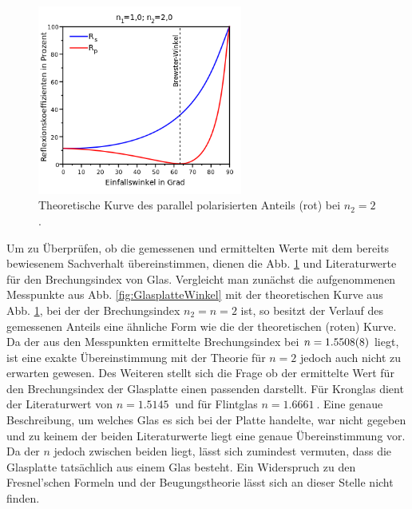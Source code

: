 		\begin{figure}[ht]
			\centering
			\includegraphics[width=0.6\textwidth]{bilder/wikiBrewster.png}
			\caption{Theoretische Kurve des parallel polarisierten Anteils (rot) bei $n_2 = 2$. \cite{wikiBrewster}}
			\label{fig:wiki_brewster}	
		\end{figure}
		Um zu Überprüfen, ob die gemessenen und ermittelten Werte mit dem bereits bewiesenem Sachverhalt übereinstimmen, dienen die Abb. \ref{fig:wiki_brewster} und Literaturwerte für den Brechungsindex von Glas.
		Vergleicht man zunächst die aufgenommenen Messpunkte aus Abb. \ref{fig:GlasplatteWinkel} mit der theoretischen Kurve aus Abb. \ref{fig:wiki_brewster}, bei der der Brechungsindex $n_2 = n = 2$ ist, so besitzt der Verlauf des gemessenen Anteils eine ähnliche Form wie die der theoretischen (roten) Kurve.
		Da der aus den Messpunkten ermittelte Brechungsindex bei $n = \SI{1,5508+-0,0008}{}$ liegt, ist eine exakte Übereinstimmung mit der Theorie für $n=2$ jedoch auch nicht zu erwarten gewesen.
		Des Weiteren stellt sich die Frage ob der ermittelte Wert für den Brechungsindex der Glasplatte  einen passenden darstellt.
		Für Kronglas dient der Literaturwert\cite{Refrac} von $n = \SI{1.5145}{}$ und für Flintglas $n = \SI{1.6661}{}$.
		Eine genaue Beschreibung, um welches Glas es sich bei der Platte handelte, war nicht gegeben und zu keinem der beiden Literaturwerte liegt eine genaue Übereinstimmung vor.
		Da der $n$ jedoch zwischen beiden liegt, lässt sich zumindest vermuten, dass die Glasplatte tatsächlich aus einem Glas besteht.
		Ein Widerspruch zu den Fresnel'schen Formeln und der Beugungstheorie lässt sich an dieser Stelle nicht finden.
		
		